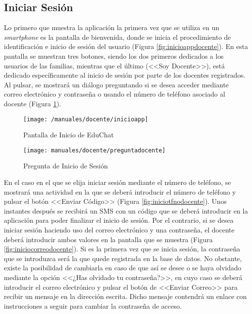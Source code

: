 \subsection*{Iniciar Sesión}
Lo primero que muestra la aplicación la primera vez que se utiliza en un \textit{smartphone} es la pantalla de bienvenida, donde se inicia el procedimiento de identificación e inicio de sesión del usuario (Figura \ref{fig:inicioappdocente}). En esta pantalla se muestran tres botones, siendo los dos primeros dedicados a los usuarios de las familias, mientras que el último (<<Soy Docente>>), está dedicado específicamente al inicio de sesión por parte de los docentes registrados. Al pulsar, se mostrará un diálogo preguntando si se desea acceder mediante correo electrónico y contraseña o usando el número de teléfono asociado al docente (Figura \ref{fig:preguntadocente}).

\begin{figure}[!h]
	\centering
	\begin{minipage}{.5\textwidth}
		\centering
		\texttt{[image: /manuales/docente/inicioapp]}
		\caption{Pantalla de Inicio de EduChat}
		\label{fig:inicioappdocente}
	\end{minipage}%
	\begin{minipage}{.5\textwidth}
		\centering
		\texttt{[image: manuales/docente/preguntadocente]}
		\caption{Pregunta de Inicio de Sesión}
		\label{fig:preguntadocente}
	\end{minipage}
\end{figure}

\clearpage

En el caso en el que se elija iniciar sesión mediante el número de teléfono, se mostrará una actividad en la que se deberá introducir el número de teléfono y pulsar el botón <<Enviar Código>> (Figura \ref{fig:iniciotfnodocente}). Unos instantes después se recibirá un \acs{SMS} con un código que se deberá introducir en la aplicación para poder finalizar el inicio de sesión. Por el contrario, si se desea iniciar sesión haciendo uso del correo electrónico y una contraseña, el docente deberá introducir ambos valores en la pantalla que se muestra (Figura \ref{fig:iniciocorreodocente}). Si es la primera vez que se inicia sesión, la contraseña que se introduzca será la que quede registrada en la base de datos. No obstante, existe la posibilidad de cambiarla en caso de que así se desee o se haya olvidado mediante la opción <<¿Has olvidado tu contraseña?>>, en cuyo caso se deberá introducir el correo electrónico y pulsar el botón de <<Enviar Correo>> para recibir un mensaje en la dirección escrita. Dicho mensaje contendrá un enlace con instrucciones a seguir para cambiar la contraseña de acceso.

